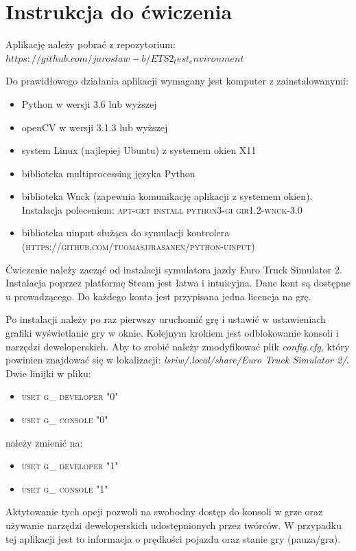 \chapter{Instrukcja do ćwiczenia}


Aplikację należy pobrać z repozytorium:
$ https://github.com/jaroslaw-b/ETS2_test_environment$

Do prawidłowego działania aplikacji wymagany jest komputer z zainstalowanymi:
\begin{itemize}
\item Python w wersji 3.6 lub wyższej
\item openCV w wersji 3.1.3 lub wyższej
\item system Linux (najlepiej Ubuntu) z systemem okien X11
\item biblioteka multiprocessing języka Python
\item biblioteka Wnck (zapewnia komunikację aplikacji z systemem okien). Instalacja poleceniem: \textsc{apt-get install python3-gi gir1.2-wnck-3.0}
\item biblioteka uinput służąca do symulacji kontrolera (\textsc{https://github.com/tuomasjjrasanen/python-uinput})
\end{itemize}

Ćwiczenie należy zacząć od instalacji symulatora jazdy Euro Truck Simulator 2. Instalacja poprzez platformę Steam jest łatwa i intuicyjna. Dane kont są dostępne u prowadzącego. Do każdego konta jest przypisana jedna licencja na grę.

Po instalacji należy po raz pierwszy uruchomić grę i ustawić w ustawieniach grafiki wyświetlanie gry w oknie.
Kolejnym krokiem jest odblokowanie konsoli i narzędzi deweloperskich. Aby to zrobić należy zmodyfikować plik \textit{config.cfg}, który powinien znajdować się w lokalizacji: \textit{lsriw/.local/share/Euro Truck Simulator 2/}. Dwie linijki w pliku:
\begin{itemize}
\item \textsc{uset g\_ developer "0"}
\item \textsc{uset g\_ console "0"}
\end{itemize}

należy zmienić na:

\begin{itemize}
\item \textsc{uset g\_ developer "1"}
\item \textsc{uset g\_ console "1"}
\end{itemize}

Aktytowanie tych opcji pozwoli na swobodny dostęp do konsoli w grze oraz używanie narzędzi deweloperskich udostępnionych przez twórców. W przypadku tej aplikacji jest to informacja o prędkości pojazdu oraz stanie gry (pauza/gra).

